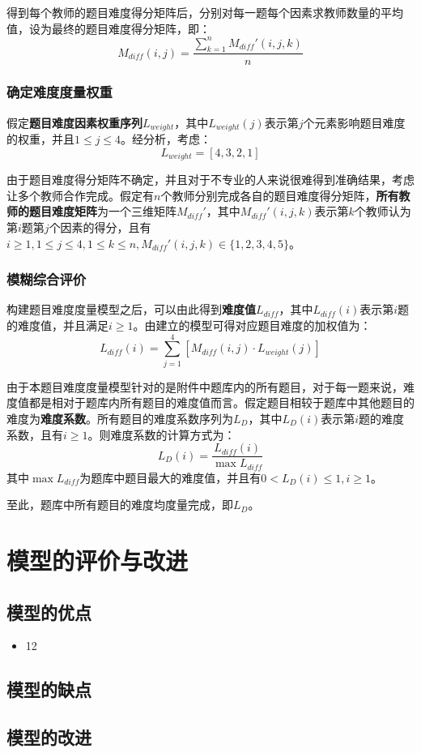 得到每个教师的题目难度得分矩阵后，分别对每一题每个因素求教师数量的平均值，设为最终的题目难度得分矩阵，即：
$$
M_{diff}(i, j) = 
    \frac{
        \sum_{k = 1}^{n}M_{diff}'(i, j, k)
    }{n}
$$

\subsubsection{确定难度度量权重}

假定\textbf{题目难度因素权重序列}$L_{weight}$，其中$L_{weight}(j)$表示第$j$个元素影响题目难度的权重，并且$1 \leq j \leq 4$。经分析，考虑：
$$L_{weight} = [4, 3, 2, 1]$$

由于题目难度得分矩阵不确定，并且对于不专业的人来说很难得到准确结果，考虑让多个教师合作完成。假定有$n$个教师分别完成各自的题目难度得分矩阵，\textbf{所有教师的题目难度矩阵}为一个三维矩阵$M_{diff}'$，其中$M_{diff}'(i, j, k)$表示第$k$个教师认为第$i$题第$j$个因素的得分，且有$i \geq 1, 1 \leq j \leq 4, 1 \leq k \leq n, M_{diff}'(i, j, k)\in \{1, 2, 3, 4, 5\}$。

\subsubsection{模糊综合评价}

构建题目难度度量模型之后，可以由此得到\textbf{难度值}$L_{diff}$，其中$L_{diff}(i)$表示第$i$题的难度值，并且满足$i \geq 1$。由建立的模型可得对应题目难度的加权值为：
$$
L_{diff}(i) = 
    \sum_{j = 1}^{4} \left [ 
        M_{diff}(i, j) \cdot L_{weight}(j)
    \right ]
$$

由于本题目难度度量模型针对的是附件中题库内的所有题目，对于每一题来说，难度值都是相对于题库内所有题目的难度值而言。假定题目相较于题库中其他题目的难度为\textbf{难度系数}。所有题目的难度系数序列为$L_D$，其中$L_D(i)$表示第$i$题的难度系数，且有$i \geq 1$。则难度系数的计算方式为：
$$
L_D(i) = 
    \frac{
        L_{diff}(i)
    } {
        \max L_{diff}
    }
$$
其中$\max L_{diff}$为题库中题目最大的难度值，并且有$0 < L_D(i) \leq 1, i \geq 1$。

至此，题库中所有题目的难度均度量完成，即$L_D$。

\subsection{}

%
%

\section{模型的评价与改进}

\subsection{模型的优点}

\begin{itemize}
    \item 12
\end{itemize}

\subsection{模型的缺点}

\subsection{模型的改进}